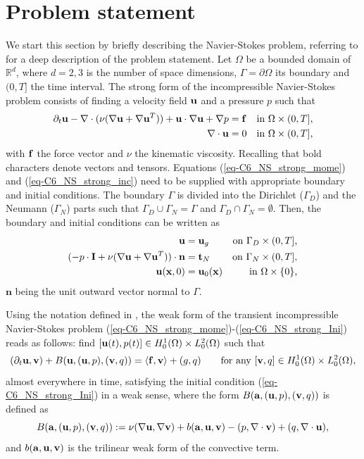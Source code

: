 \section{Problem statement}
\label{sec-C6_prob_statement}
We start this section by briefly describing the Navier-Stokes problem, referring to  for a deep description of the problem statement.
Let $\Omega$ be a bounded domain of $\mathbb{R}^d$, where $d=2,3$ is the number of space dimensions, $\Gamma=\partial\Omega$ its boundary and $(0,T]$ the time interval. The strong form of the incompressible Navier-Stokes problem consists of finding a velocity field ${\bf u}$ and a pressure $p$ such that 
\begin{align}
\label{eq-C6_NS_strong_mome}
\partial_t{\bf u}-\nabla\cdot(\nu(\nabla{\bf u}+\nabla{\bf u}^T))+{\bf u}\cdot\nabla{\bf u}+\nabla p&={\bf f}&\mbox{in $\Omega\times(0,T]$,}\\
\label{eq-C6_NS_strong_inc}
\nabla\cdot{\bf u}&=0&\mbox{in $\Omega\times(0,T]$,}
\end{align}
with ${\bf f}$ the force vector and $\nu$ the kinematic viscosity. Recalling that bold characters denote vectors and tensors. Equations (\ref{eq-C6_NS_strong_mome}) and (\ref{eq-C6_NS_strong_inc}) need to be supplied with appropriate boundary and initial conditions. The boundary $\Gamma$ is divided into the Dirichlet ($\Gamma_D$) and the Neumann ($\Gamma_N$) parts such that $\Gamma_D\cup\Gamma_N=\Gamma$ and $\Gamma_D\cap\Gamma_N=\emptyset$. Then, the boundary and initial conditions can be written as
\begin{align}
\label{eq-C6_NS_strong_Dir}
{\bf u}&={\bf u}_g&\mbox{on $\Gamma_D\times(0,T]$,}\\
\label{eq-C6_NS_strong_Neu}
(-p\cdot\mathbf{I}+\nu(\nabla{\bf u}+\nabla{\bf u}^T))\cdot\mathbf{n}&=\mathbf{t}_N&\mbox{on $\Gamma_N\times(0,T]$,}\\
\label{eq-C6_NS_strong_Ini}
{\bf u}({\bf x},0)&={\bf u}_0({\bf x})&\mbox{in $\Omega\times\{0\}$,}
\end{align}
$\mathbf{n}$ being the unit outward vector normal to $\Gamma$. 

Using the notation defined in , the weak form of the transient incompressible Navier-Stokes problem (\ref{eq-C6_NS_strong_mome})-(\ref{eq-C6_NS_strong_Ini}) reads as follows: find $[{\bf u}(t),p(t)]\in H_0^1(\Omega) \times L^2_0(\Omega)$ such that
\begin{equation}
\label{eq-C6_NS_weak}
(\partial_t{\bf u},{\bf v}) + B({\bf u},({\bf u},p),({\bf v},q)) = \left<{\bf f},{\bf v}\right> + (g,q)
\quad\quad \hbox{for any}  \ [{\bf v},q ] \in H_0^1(\Omega) \times L^2_0(\Omega),
\end{equation}
almost everywhere in time, satisfying the initial condition (\ref{eq-C6_NS_strong_Ini}) in a weak sense, where the form $B({\bf a},({\bf u},p),({\bf v},q))$ is defined as 
\begin{equation}
\label{eq-C6_bilinear}
B({\bf a},({\bf u},p),({\bf v},q)):=\nu(\nabla{\bf u},\nabla{\bf v})+b({\bf a},{\bf u},{\bf v})-(p,\nabla\cdot{\bf v})+(q,\nabla\cdot{\bf u}),
\end{equation}
and $b({\bf a},{\bf u},{\bf v})$ is the trilinear weak form of the convective term.

